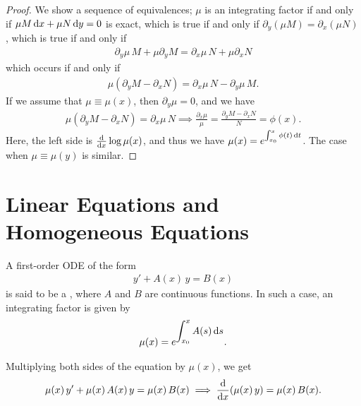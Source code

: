 \begin{proof}
    We show a sequence of equivalences; $\mu$ is an integrating factor if and only if $\mu M \, \mathrm{d}x + \mu N \, \mathrm{d}y = 0$ is exact, which is true if and only if $\partial_{y}(\mu M) = \partial_{x}(\mu N)$, which is true if and only if
    \begin{align}
        \partial_{y} \mu \, M + \mu \partial_{y} M = \partial_{x} \mu \, N + \mu \partial_{x} N
    \end{align}
    which occurs if and only if
    \begin{align}
        \mu (\partial_{y} M - \partial_{x} N) = \partial_{x} \mu \, N - \partial_{y} \mu \, M.
    \end{align}
    If we assume that $\mu \equiv \mu(x)$, then $\partial_{y} \mu = 0$, and we have
    \begin{align}
        \mu (\partial_{y} M - \partial_{x} N) = \partial_{x} \mu \, N \implies \frac{\partial_{x} \mu}{\mu} = \frac{\partial_{y} M - \partial_{x} N}{N} = \phi(x).
    \end{align}
    Here, the left side is $\frac{\mathrm{d}}{\mathrm{d}x} \log \mu(x)$, and thus we have $\mu(x) = e^{\int_{x_{0}}^{x} \phi(t) \, \mathrm{d}t}$. The case when $\mu \equiv \mu(y)$ is similar.
\end{proof}

\section{Linear Equations and Homogeneous Equations}

A first-order ODE of the form
\begin{align}
    y' + A(x) \, y = B(x)
\end{align}
is said to be a , where $A$ and $B$ are continuous functions. In such a case, an integrating factor is given by
\begin{align}
    \mu(x) = e^{\displaystyle\int_{x_{0}}^{x} A(s) \, \mathrm{d}s}.
\end{align}

Multiplying both sides of the equation by $\mu(x)$, we get
\begin{align}
    \mu(x) \, y' + \mu(x) \, A(x) \, y = \mu(x) \, B(x) \implies \frac{\mathrm{d}}{\mathrm{d}x} (\mu(x) \, y) = \mu(x) \, B(x).
\end{align}

